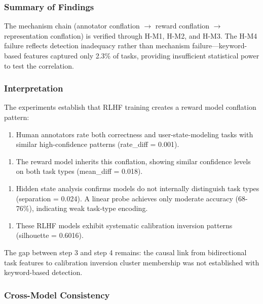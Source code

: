 
\subsubsection{Summary of Findings}

The mechanism chain (annotator conflation $\rightarrow$ reward conflation $\rightarrow$ representation conflation) is verified through H-M1, H-M2, and H-M3. The H-M4 failure reflects detection inadequacy rather than mechanism failure---keyword-based features captured only 2.3\% of tasks, providing insufficient statistical power to test the correlation.

\subsubsection{Interpretation}

The experiments establish that RLHF training creates a reward model conflation pattern:

\begin{enumerate}
\item Human annotators rate both correctness and user-state-modeling tasks with similar high-confidence patterns (rate\_diff = 0.001).
\end{enumerate}

\begin{enumerate}
\item The reward model inherits this conflation, showing similar confidence levels on both task types (mean\_diff = 0.018).
\end{enumerate}

\begin{enumerate}
\item Hidden state analysis confirms models do not internally distinguish task types (separation = 0.024). A linear probe achieves only moderate accuracy (68-76\%), indicating weak task-type encoding.
\end{enumerate}

\begin{enumerate}
\item These RLHF models exhibit systematic calibration inversion patterns (silhouette = 0.6016).
\end{enumerate}

The gap between step 3 and step 4 remains: the causal link from bidirectional task features to calibration inversion cluster membership was not established with keyword-based detection.

\subsubsection{Cross-Model Consistency}

